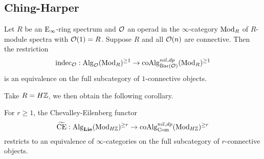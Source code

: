 


\subsection{Ching-Harper}
\begin{theorem}
\cite{Ching-Harper}
\label{Ching-Harper's Koszul duality}
	Let $R$ be an $\operatorname{E}_{\infty}$-ring spectrum and ${\mathcal{O}}$ an operad in the $\infty$-category $\operatorname{Mod}_R$ of $R$-module spectra with ${\mathcal{O}}(1)=R$. Suppose $R$ and all ${\mathcal{O}}(n)$ are connective. Then the restriction 
	\[
	\operatorname{indec}_{{\mathcal{O}}}: \operatorname{Alg}_{{\mathcal{O}}}(\operatorname{Mod}_R)^{\geq 1} \to \operatorname{coAlg}^{nil, dp}_{\operatorname{Bar}({\mathcal{O}})}(\operatorname{Mod}_R)^{\geq 1}
	\]
	 is an equivalence on the full subcategory of $1$-connective objects.
\end{theorem}

Take $R=H{\mathbb{Z}}$, we then obtain the following corollary.
\begin{corollary}
	For $r\geq 1$, the Chevalley-Eilenberg functor 
	\[
	\widetilde{\operatorname{CE}}: \operatorname{Alg}_{\mathbf{Lie}}(\operatorname{Mod}_{H{\mathbb{Z}}})^{\geq r} \to \operatorname{coAlg}^{nil, dp}_{\operatorname{Com}}(\operatorname{Mod}_{H{\mathbb{Z}}})^{\geq r}
	\]
	restricts to an equivalence of $\infty$-categories on the full subcategory of $r$-connective objects.
\end{corollary}



